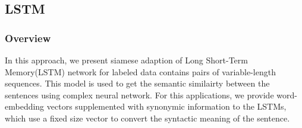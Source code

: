 
\subsection{LSTM}

\subsubsection{Overview}
In this approach, we present  siamese adaption of Long Short-Term Memory(LSTM) network for labeled data contains pairs of variable-length sequences. This model is used to get the semantic similairty between the sentences using complex neural network. For this applications, we provide word-embedding vectors supplemented with synonymic information to the LSTMs, which use a fixed size vector to convert the syntactic meaning of the sentence. 

